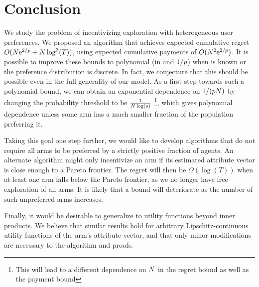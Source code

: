 \section{Conclusion}
We study the problem of incentivizing exploration with heterogeneous
user preferences.
We proposed an algorithm that achieves expected cumulative regret
$O(N \mathrm{e}^{2/p} + N \log^3(T))$,
using expected cumulative payments of $O(N^2 \mathrm{e}^{2/p})$.
It is possible to improve these bounds to polynomial (in \ARMNUM and
$1/p$) when \MinProb is known or the preference distribution is
discrete.
In fact, we conjecture that this should be possible even in the full
generality of our model.
As a first step towards such a polynomial bound, we can obtain an exponential dependence on
$1/(p N)$ by changing the probability threshold to be $\frac{1}{N\log(s)}$
\footnote{This will lead to a different dependence on $N$
in the regret bound as well as the payment bound}, which gives polynomial dependence unless some
arm has a much smaller fraction of the population preferring it.

Taking this goal one step further, we would like to 
develop algorithms that do not require all arms to be preferred by a
strictly positive fraction of agents.
An alternate algorithm might only incentivize an arm if its estimated
attribute vector is close enough to a Pareto frontier.
The regret will then be $\Omega(\log(T))$ when at least one arm falls
below the Pareto frontier, as we no longer have free exploration of
all arms. 
It is likely that a bound will deteriorate as the number of such
unpreferred arms increases.

Finally, it would be desirable to generalize to utility
functions beyond inner products.
We believe that similar results hold for arbitrary
Lipschitz-continuous utility functions of the arm's attribute vector,
and that only minor modifications are necessary to the algorithm and
proofs.
